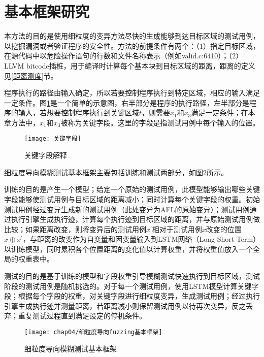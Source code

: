 \section{基本框架研究}

本方法的目的是使用细粒度的变异方法尽快的生成能够到达目标区域的测试用例，以挖掘漏洞或者验证程序的安全性。方法的前提条件有两个：（1）指定目标区域，在源代码中以危险操作语句的行数和文件名称表示（例如valid.c:6410）；（2）LLVM bitcode插桩，用于编译时计算每个基本块到目标区域的距离，距离的定义见\ref{距离测度}节。

程序执行的路径由输入确定，所以若要控制程序执行到特定区域，相应的输入满足一定条件。图\ref{关键字段}是一个简单的示意图，右半部分是程序的执行路径，左半部分是程序的输入，若想要控制程序执行到关键区域$t$，则需要$x_1$和$x_3$满足一定条件；在本章方法中，$x_1$和$x_3$被称为关键字段。这里的字段是指测试用例中每个输入的位置。

\begin{figure}[htb]
\begin{center}
\texttt{[image: 关键字段]}
\end{center}
\caption{关键字段解释}
\label{关键字段}
\end{figure}


细粒度导向模糊测试基本框架主要包括训练和测试两部分，如图\ref{细粒度导向fuzzing基本框架}所示。

训练的目的是产生一个模型；给定一个原始的测试用例，此模型能够输出哪些关键字段能够使测试用例与目标区域的距离减小；同时计算每个关键字段的权重。初始测试用例经过变异生成新的测试用例（此处变异为AFL的原始变异）；测试用例通过执行引擎生成执行迹，计算每个执行迹到目标区域的距离，并与原始测试用例做比较；如果距离改变，则将变异后的测试用例$x^{'}$相对于测试用例$x$改变的位置$x \oplus x^{'}$，与距离的改变作为自变量和因变量输入到LSTM网络（Long Short Term）以训练模型，同时累积各个位置距离的变化值以计算权重，并将权重值放入一个全局的权重表中。

测试的目的是基于训练的模型和字段权重引导模糊测试快速执行到目标区域，测试阶段的测试用例是随机挑选的。对于每一个测试用例，使用LSTM模型计算关键字段；根据每个字段的权重，对关键字段进行细粒度变异，生成测试用例；经过执行引擎生成执行迹并测量距离，若距离减小则保留测试用例以待再次变异，反之丢弃；重复测试过程直到满足设定的停机条件。

\begin{figure}[htb]
\begin{center}
\texttt{[image: chap04/细粒度导向fuzzing基本框架]}
\end{center}
\caption{细粒度导向模糊测试基本框架}
\label{细粒度导向fuzzing基本框架}
\end{figure}

